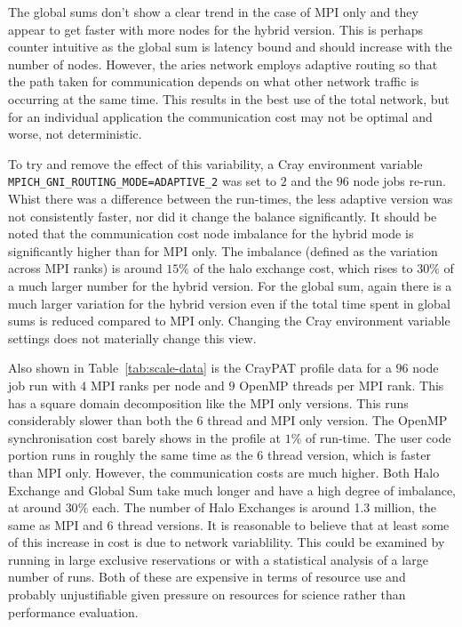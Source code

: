 The global sums don't show a clear trend in the case of MPI only and
they appear to get faster with more nodes for the hybrid version. This
is perhaps counter intuitive as the global sum is latency bound and
should increase with the number of nodes. However, the aries network
employs adaptive routing so that the path taken for communication
depends on what other network traffic is occurring at the same
time. This results in the best use of the total network, but for an
individual application the communication cost may not be optimal and
worse, not deterministic.

To try and remove the effect of this variability, a Cray environment
variable \verb+MPICH_GNI_ROUTING_MODE=ADAPTIVE_2+ was set to $2$ and the $96$ node jobs re-run.
Whist there was a difference between the run-times, the less adaptive
version was not consistently faster, nor did it change the balance
significantly. It should be noted that the communication cost
node imbalance for the hybrid mode is significantly higher than for MPI
only. The imbalance (defined as the variation across MPI ranks) is
around $15\%$ of the halo exchange cost, which rises to $30\%$ of a
much larger number for the hybrid version. For the global sum, again
there is a much larger variation for the hybrid version even if the total time spent in
global sums is reduced compared to MPI only. Changing the Cray
environment variable settings does not materially change this view. 

Also shown in Table~\ref{tab:scale-data} is the CrayPAT profile data
for a $96$ node job run with $4$ MPI ranks per node and $9$ OpenMP
threads per MPI rank. This has a square domain decomposition like the
MPI only versions. This runs considerably slower than both the $6$
thread and MPI only version. The OpenMP synchronisation cost barely
shows in the profile at $1\%$ of run-time. The user code portion runs
in roughly the same time as the $6$ thread version, which is faster
than MPI only. However, the communication costs are much higher. Both
Halo Exchange and Global Sum take much longer and have a high degree
of imbalance, at around $30\%$ each. The number of Halo Exchanges is
around 1.3 million, the same as MPI and $6$ thread versions.  It is
reasonable to believe that at least some of this increase in cost is
due to network variablility. This could be examined by running in
large exclusive reservations or with a statistical analysis of a large
number of runs. Both of these are expensive in terms of resource use and
probably unjustifiable given pressure on resources for science rather
than performance evaluation.

